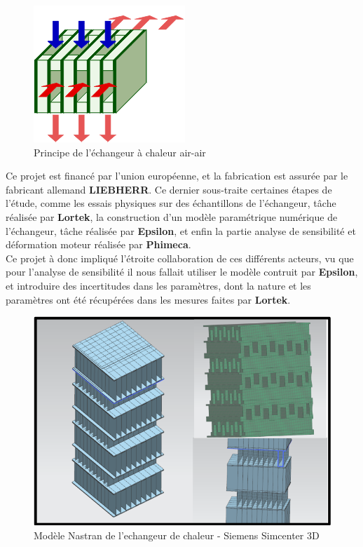 \documentclass[a4paper,10pt]{article}
\begin{document}
\begin{figure}[H]
   \centering   
   \includegraphics[scale=0.5]{principeEchangeur.png}
      \caption{Principe de l'échangeur à chaleur air-air}
         \label{principleExchanger}
\end{figure}

Ce projet est financé par l'union européenne, et la fabrication est assurée par le fabricant allemand \textbf{LIEBHERR}. Ce dernier sous-traite certaines étapes de l'étude, comme les essais physiques sur des échantillons de l'échangeur, tâche réalisée par \textbf{Lortek}, la construction d'un modèle paramétrique numérique de l'échangeur, tâche réalisée par \textbf{Epsilon}, et enfin la partie analyse de sensibilité et déformation moteur réalisée par \textbf{Phimeca}. \\

Ce projet à donc impliqué l'étroite collaboration de ces différents acteurs, vu que pour l'analyse de sensibilité il nous fallait utiliser le modèle contruit par \textbf{Epsilon}, et introduire des incertitudes dans les paramètres, dont la nature et les paramètres ont été récupérées dans les mesures faites par \textbf{Lortek}.


\begin{figure}[H]
   \centering   
   \includegraphics[scale=0.3]{exchangerModel.png}
      \caption{Modèle Nastran de l'echangeur de chaleur - Siemens Simcenter 3D}
         \label{exchangerModel}
\end{figure}
\end{document}
